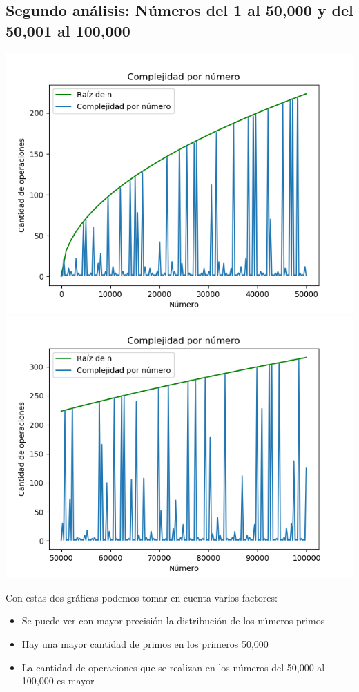 \subsection{Segundo an\'alisis: N\'umeros del 1 al 50,000 y del 50,001 al 100,000}
\begin{center}
	\includegraphics[scale=0.5]{Numeros1al50000.png}
    \includegraphics[scale=0.5]{Numeros50000al100000.png}
\end{center}
Con estas dos gr\'aficas podemos tomar en cuenta varios factores:
\begin{itemize}
	\item Se puede ver con mayor precisi\'on la distribuci\'on de los n\'umeros primos
	\item Hay una mayor cantidad de primos en los primeros 50,000
	\item La cantidad de operaciones que se realizan en los n\'umeros del 50,000 al 100,000 es mayor
\end{itemize}


